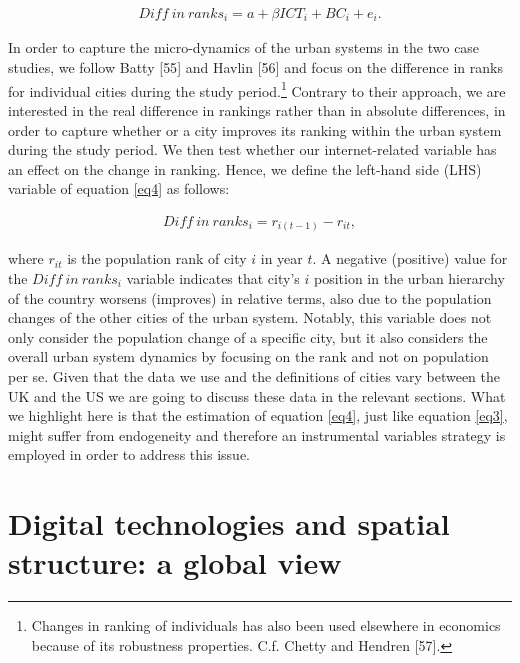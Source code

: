 \documentclass[10pt,letterpaper]{article}
\begin{document}
\begin{align}
Diff\:in\:ranks_{i} = a + \beta ICT_{i} + B C_{i} + e_{i}.\label{eq4}
\end{align}

In order to capture the micro-dynamics of the urban systems in the two
case studies, we follow Batty {[}55{]} and Havlin {[}56{]} and focus on
the difference in ranks for individual cities during the study
period.\footnote{Changes in ranking of individuals has also been used
  elsewhere in economics because of its robustness properties. C.f.
  Chetty and Hendren {[}57{]}.} Contrary to their approach, we are
interested in the real difference in rankings rather than in absolute
differences, in order to capture whether or a city improves its ranking
within the urban system during the study period. We then test whether
our internet-related variable has an effect on the change in ranking.
Hence, we define the left-hand side (LHS) variable of equation \ref{eq4}
as follows:

\begin{align}
Diff\:in\:ranks_{i} = r_{i(t-1)} - r_{it},\label{eq5}
\end{align}

\noindent where \(r_{it}\) is the population rank of city \(i\) in year
\(t\). A negative (positive) value for the \(Diff\:in\:ranks_{i}\)
variable indicates that city's \(i\) position in the urban hierarchy of
the country worsens (improves) in relative terms, also due to the
population changes of the other cities of the urban system. Notably,
this variable does not only consider the population change of a specific
city, but it also considers the overall urban system dynamics by
focusing on the rank and not on population per se. Given that the data
we use and the definitions of cities vary between the UK and the US we
are going to discuss these data in the relevant sections. What we
highlight here is that the estimation of equation \ref{eq4}, just like
equation \ref{eq3}, might suffer from endogeneity and therefore an
instrumental variables strategy is employed in order to address this
issue.

\hypertarget{sec4}{%
\section{Digital technologies and spatial structure: a global
view}\label{sec4}}
\end{document}
